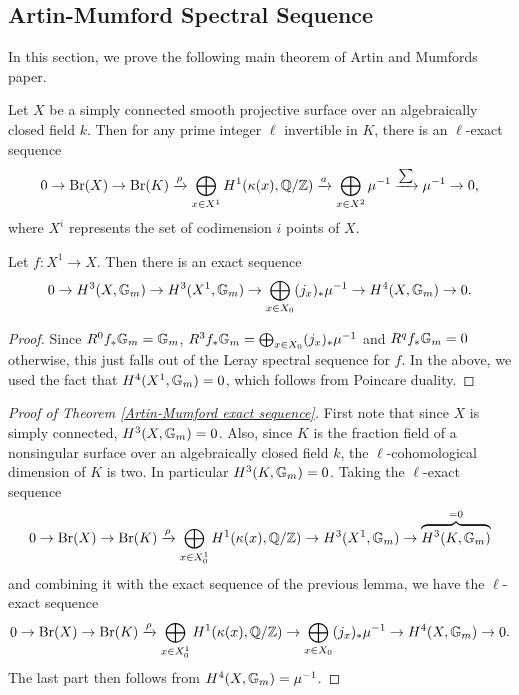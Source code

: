 \subsection{Artin-Mumford Spectral Sequence}
In this section, we prove the following main theorem of Artin and Mumfords paper.
\begin{thm}\label{Artin-Mumford exact sequence}
Let $X$ be a simply connected smooth projective surface over an algebraically closed field $k$.  Then for any prime integer $\ell$ invertible in $K$, there is an $\ell$-exact sequence
$$0\rightarrow\textnormal{Br}(X)\rightarrow\textnormal{Br}(K)\xrightarrow{\rho}\bigoplus_{x\in X^1} H^1(\kappa(x),\mathbb{Q}/\mathbb{Z})\xrightarrow{a}\bigoplus_{x\in X^2} \mu^{-1}\xrightarrow{\sum}\mu^{-1}\rightarrow 0,$$
where $X^i$ represents the set of codimension $i$ points of $X$.
\end{thm}

\begin{lem}
Let $f: X^1\rightarrow X$.  Then there is an exact sequence
$$0\rightarrow H^3(X,\mathbb{G}_m)\rightarrow H^3(X^1,\mathbb{G}_m)\rightarrow \bigoplus_{x\in X_0} (j_x)_*\mu^{-1}\rightarrow H^4(X,\mathbb{G}_m)\rightarrow 0.$$
\end{lem}
\begin{proof}
Since $R^0f_*\mathbb{G}_m = \mathbb{G}_m$, $R^3f_*\mathbb{G}_m = \bigoplus_{x\in X_0} (j_x)_*\mu^{-1}$ and $R^qf_*\mathbb{G}_m = 0$ otherwise, this just falls out of the Leray spectral sequence for $f$.  In the above, we used the fact that $H^4(X^1,\mathbb{G}_m)=0$, which follows from Poincare duality.
\end{proof}

\begin{proof}[Proof of Theorem \ref{Artin-Mumford exact sequence}]
First note that since $X$ is simply connected, $H^3(X,\mathbb{G}_m) = 0$.  Also, since $K$ is the fraction field of a nonsingular surface over an algebraically closed field $k$, the $\ell$-cohomological dimension of $K$ is two.  In particular $H^3(K,\mathbb{G}_m) = 0$.  Taking the $\ell$-exact sequence
$$0\rightarrow \textnormal{Br}(X)\rightarrow\textnormal{Br}(K)\xrightarrow{\rho}\bigoplus_{x\in X^1_0} H^1(\kappa(x),\mathbb{Q}/\mathbb{Z})\rightarrow H^3(X^1,\mathbb{G}_m)\rightarrow  \overbrace{H^3(K,\mathbb{G}_m)}^{=0}$$
and combining it with the exact sequence of the previous lemma, we have the $\ell$-exact sequence
$$0\rightarrow \textnormal{Br}(X)\rightarrow\textnormal{Br}(K)\xrightarrow{\rho}\bigoplus_{x\in X^1_0} H^1(\kappa(x),\mathbb{Q}/\mathbb{Z})\rightarrow \bigoplus_{x\in X_0}(j_x)_*\mu^{-1}\rightarrow H^4(X,\mathbb{G}_m)\rightarrow 0.$$
The last part then follows from $H^4(X,\mathbb{G}_m) = \mu^{-1}$.
\end{proof}


